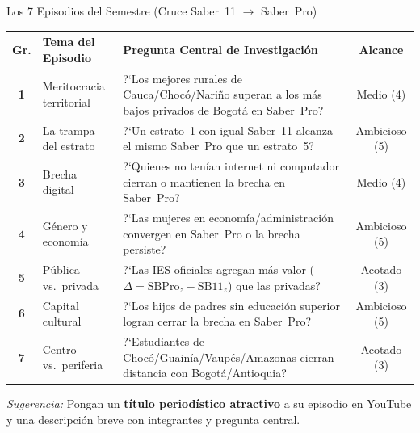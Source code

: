 \documentclass[aspectratio=169, 10pt]{beamer}
\begin{document}
\begin{frame}{Los 7 Episodios del Semestre (Cruce Saber~11 $\rightarrow$ Saber~Pro)}
  \renewcommand{\arraystretch}{1.18}
  \begin{center}
  \scriptsize
  \begin{tabular}{c l >{\raggedright\arraybackslash}p{7.4cm} c}
    \toprule
    \textbf{Gr.} & \textbf{Tema del Episodio} & \textbf{Pregunta Central de Investigaci\'on} & \textbf{Alcance} \\
    \midrule
    \textbf{1} & Meritocracia territorial & ?`Los mejores rurales de Cauca/Choc\'o/Nari\~no superan a los m\'as bajos privados de Bogot\'a en Saber~Pro? & Medio (4) \\
    \textbf{2} & La trampa del estrato & ?`Un estrato~1 con igual Saber~11 alcanza el mismo Saber~Pro que un estrato~5? & Ambicioso (5) \\
    \textbf{3} & Brecha digital & ?`Quienes no ten\'ian internet ni computador cierran o mantienen la brecha en Saber~Pro? & Medio (4) \\
    \textbf{4} & G\'enero y econom\'ia & ?`Las mujeres en econom\'ia/administraci\'on convergen en Saber~Pro o la brecha persiste? & Ambicioso (5) \\
    \textbf{5} & P\'ublica vs.\ privada & ?`Las IES oficiales agregan m\'as valor ($\Delta = \text{SBPro}_z - \text{SB11}_z$) que las privadas? & Acotado (3) \\
    \textbf{6} & Capital cultural & ?`Los hijos de padres sin educaci\'on superior logran cerrar la brecha en Saber~Pro? & Ambicioso (5) \\
    \textbf{7} & Centro vs.\ periferia & ?`Estudiantes de Choc\'o/Guain\'ia/Vaup\'es/Amazonas cierran distancia con Bogot\'a/Antioquia? & Acotado (3) \\
    \bottomrule
  \end{tabular}
  \end{center}
  \renewcommand{\arraystretch}{1.0}
  \vspace{2pt}
  {\footnotesize \textit{Sugerencia:} Pongan un \textbf{t\'itulo period\'istico atractivo} a su episodio en YouTube y una descripci\'on breve con integrantes y pregunta central.}
\end{frame}
\end{document}
